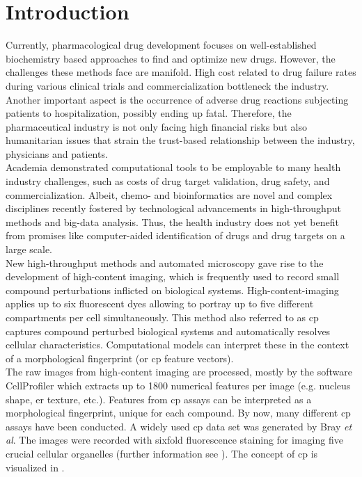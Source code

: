 \chapter{Introduction}\label{sec:introduction}
Currently, pharmacological drug development focuses on well-established biochemistry based approaches to find and optimize new drugs. However, the challenges these methods face are manifold. High cost related to drug failure rates during various clinical trials and commercialization bottleneck the industry. Another important aspect is the occurrence of adverse drug reactions subjecting patients to hospitalization, possibly ending up fatal. Therefore, the pharmaceutical industry is not only facing high financial risks but also humanitarian issues that strain the trust-based relationship between the industry, physicians and patients.\cite{Katara2013}\\
Academia demonstrated computational tools to be employable to many health industry challenges, such as costs of drug target validation, drug safety, and commercialization.\cite{Myers2001}\cite{Nelson2008} Albeit, chemo- and bioinformatics are novel and complex disciplines recently fostered by technological advancements in high-throughput methods and big-data analysis. Thus, the health industry does not yet benefit from promises like computer-aided identification of drugs and drug targets on a large scale.\\
New high-throughput methods and automated microscopy gave rise to the development of high-content imaging, which is frequently used to record small compound perturbations inflicted on biological systems. High-content-imaging applies up to six fluorescent dyes allowing to portray up to five different compartments per cell simultaneously. This method also referred to as \acf{cp} captures compound perturbed biological systems and automatically resolves cellular characteristics.  Computational models can interpret these in the context of a morphological fingerprint (or \ac{cp} feature vectors).\cite{Bray2017,Simm2017}\\
The raw images from high-content imaging are processed, mostly by the software CellProfiler\cite{Carpenter2006} which extracts up to \num{1800} numerical features per image (e.g. nucleus shape, \ac{er} texture, etc.). Features from \ac{cp} assays can be interpreted as a morphological fingerprint, unique for each compound.\cite{Simm2017} By now, many different \ac{cp} assays have been conducted. A widely used \ac{cp} data set was generated by Bray \textit{et al}.\cite{Bray2016} The images were recorded with sixfold fluorescence staining for imaging five crucial cellular organelles (further information see ).\cite{Bray2017} The concept of \ac{cp} is visualized in .\\
